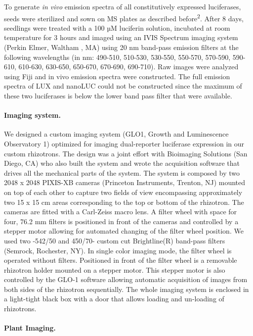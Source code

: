 \documentclass[]{article}
\begin{document}
To generate \emph{in vivo} emission spectra of all constitutively
expressed luciferases, seeds were sterilized and sown on MS plates as
described before\textsuperscript{2}. After 8 days, seedlings were
treated with a 100 µM luciferin solution, incubated at room temperature
for 3 hours and imaged using an IVIS Spectrum imaging system (Perkin
Elmer, Waltham , MA) using 20 nm band-pass emission filters at the
following wavelengths (in nm: 490-510, 510-530, 530-550, 550-570,
570-590, 590-610, 610-630, 630-650, 650-670, 670-690, 690-710). Raw
images were analyzed using Fiji and in vivo emission spectra were
constructed. The full emission spectra of LUX and nanoLUC could not be
constructed since the maximum of these two luciferases is below the
lower band pass filter that were available.

\paragraph{Imaging system.}\label{imaging-system.}

We designed a custom imaging system (GLO1, Growth and Luminescence
Observatory 1) optimized for imaging dual-reporter luciferase expression
in our custom rhizotrons. The design was a joint effort with Bioimaging
Solutions (San Diego, CA) who also built the system and wrote the
acquisition software that drives all the mechanical parts of the system.
The system is composed by two 2048 x 2048 PIXIS-XB cameras (Princeton
Instruments, Trenton, NJ) mounted on top of each other to capture two
fields of view encompassing approximately two 15 x 15 cm areas
corresponding to the top or bottom of the rhizotron. The cameras are
fitted with a Carl-Zeiss macro lens. A filter wheel with space for four,
76.2 mm filters is positioned in front of the cameras and controlled by
a stepper motor allowing for automated changing of the filter wheel
position. We used two -542/50 and 450/70- custom cut Brightline(R)
band-pass filters (Semrock, Rochester, NY). In single color imaging
mode, the filter wheel is operated without filters. Positioned in front
of the filter wheel is a removable rhizotron holder mounted on a stepper
motor. This stepper motor is also controlled by the GLO-1 software
allowing automatic acquisition of images from both sides of the
rhizotron sequentially. The whole imaging system is enclosed in a
light-tight black box with a door that allows loading and un-loading of
rhizotrons.

\paragraph{Plant Imaging.}\label{plant-imaging.}
\end{document}

